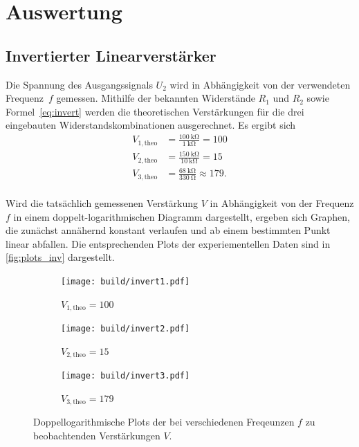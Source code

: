 \section{Auswertung}
\label{sec:Auswertung}

\subsection{Invertierter Linearverstärker}
\label{sec:Invertierter_Linearverstärker}
Die Spannung des Ausgangssignals $U_2$ wird in Abhängigkeit von der verwendeten Frequenz~$f$ gemessen. Mithilfe
der bekannten Widerstände $R_1$ und $R_2$ sowie Formel~\eqref{eq:invert} werden die theoretischen Verstärkungen für die drei eingebauten
Widerstandskombinationen ausgerechnet. Es ergibt sich
\begin{align*}
  V_{1, \mathrm{theo}} &= \frac{\qty{100}{\kilo\ohm}}{\qty{1}{\kilo\ohm}} = \num{100} \\
  V_{2, \mathrm{theo}} &= \frac{\qty{150}{\kilo\ohm}}{\qty{10}{\kilo\ohm}} = \num{15} \\
  V_{3, \mathrm{theo}} &= \frac{\qty{68}{\kilo\ohm}}{\qty{330}{\ohm}} \approx \num{179}. \\  
\end{align*}

Wird die tatsächlich gemessenen Verstärkung $V$ in Abhängigkeit von der Frequenz $f$ in einem doppelt-logarithmischen Diagramm dargestellt,
ergeben sich Graphen, die zunächst annähernd konstant verlaufen und ab einem bestimmten Punkt linear abfallen. Die entsprechenden Plots
der experiementellen Daten sind in \autoref{fig:plots_inv} dargestellt.

\begin{figure}
  \begin{subfigure}[c]{0.9\textwidth}
    \centering
    \texttt{[image: build/invert1.pdf]}
    \caption{$V_{1, \mathrm{theo}} = 100$}
  \end{subfigure}
  \begin{subfigure}[c]{0.9\textwidth}
    \centering
    \texttt{[image: build/invert2.pdf]}
    \caption{$V_{2, \mathrm{theo}} = 15$}
  \end{subfigure}
  \begin{subfigure}[c]{0.9\textwidth}
    \centering
    \texttt{[image: build/invert3.pdf]}
    \caption{$V_{3, \mathrm{theo}} = 179$}
  \end{subfigure}
  \caption{Doppellogarithmische Plots der bei verschiedenen Freqeunzen $f$ zu beobachtenden Verstärkungen $V$.}
  \label{fig:plots_inv}
\end{figure}

